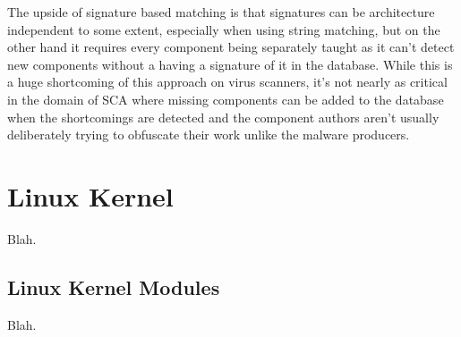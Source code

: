 The upside of signature based matching is that signatures can be architecture independent to some
extent, especially when using string matching, but on the other hand it requires every component
being separately taught as it can't detect new components without a having a signature of it in the
database. While this is a huge shortcoming of this approach on virus scanners, it's not nearly as
critical in the domain of SCA where missing components can be added to the database when the
shortcomings are detected and the component authors aren't usually deliberately trying to obfuscate
their work unlike the malware producers.

\section{Linux Kernel}

Blah.

\subsection{Linux Kernel Modules}

Blah.
